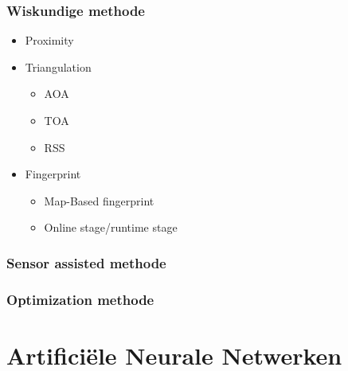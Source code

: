 		\subsubsection{Wiskundige methode}
			\begin{itemize}
				\item Proximity
				\item Triangulation
					\begin{itemize}
						\item AOA
						\item TOA
						\item RSS
					\end{itemize}
				\item Fingerprint
					\begin{itemize}
						\item Map-Based fingerprint
						\item Online stage/runtime stage
					\end{itemize}
			\end{itemize}
		\subsubsection{Sensor assisted methode}
		\subsubsection{Optimization methode}
\section{Artifici\"ele Neurale Netwerken}


